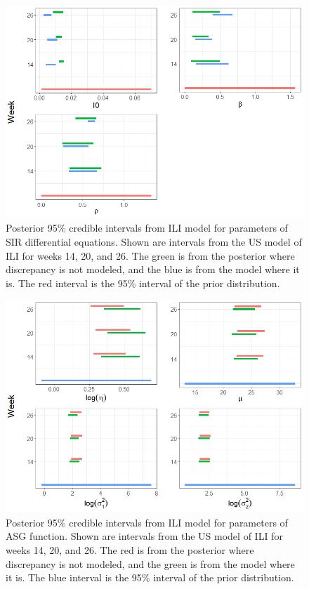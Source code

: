 \documentclass{article}
\begin{document}
\begin{figure}[hbt!]
    \centering
    \includegraphics[scale=.6]{Images/posterior_theta_sir.png}
    \caption{Posterior 95\% credible intervals from ILI model for parameters of SIR differential equations. Shown are intervals from the US model of ILI for weeks 14, 20, and 26. The green is from the posterior where discrepancy is not modeled, and the blue is from the model where it is. The red interval is the 95\% interval of the prior distribution.}
    \label{fig:posterior_theta_sir}
\end{figure}

\begin{figure}[hbt!]
    \centering
    \includegraphics[scale=.6]{Images/posterior_theta.png}
    \caption{Posterior 95\% credible intervals from ILI model for parameters of ASG function. Shown are intervals from the US model of ILI for weeks 14, 20, and 26. The red is from the posterior where discrepancy is not modeled, and the green is from the model where it is. The blue interval is the 95\% interval of the prior distribution.}
    \label{fig:posterior_theta}
\end{figure}
\end{document}
